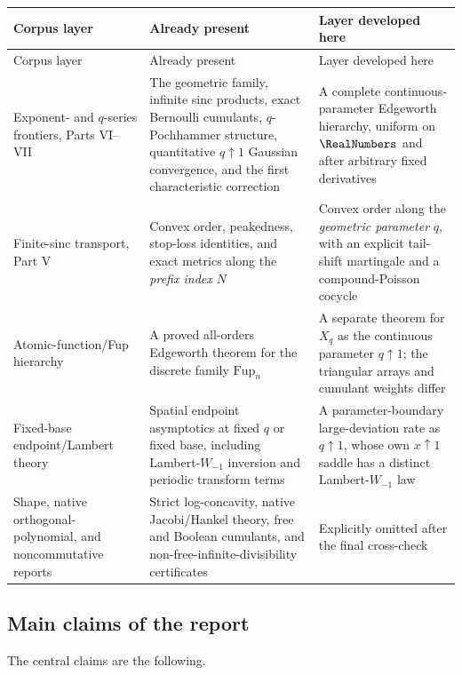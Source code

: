 \documentclass[11pt,a4paper]{article}
\theoremstyle{definition}
\begin{document}
\begin{longtable}{p{}p{}p{}}
\toprule
Corpus layer & Already present & Layer developed here \\
\midrule
\endfirsthead
\toprule
Corpus layer & Already present & Layer developed here \\
\midrule
\endhead
Exponent- and $q$-series frontiers, Parts VI--VII
& The geometric family, infinite sinc products, exact Bernoulli cumulants,
$q$-Pochhammer structure, quantitative $q\uparrow1$ Gaussian convergence, and
the first characteristic correction
& A complete continuous-parameter Edgeworth hierarchy, uniform on $\RealNumbers$ and
after arbitrary fixed derivatives \\
\addlinespace
Finite-sinc transport, Part V
& Convex order, peakedness, stop-loss identities, and exact metrics along the
\emph{prefix index} $N$
& Convex order along the \emph{geometric parameter} $q$, with an explicit
tail-shift martingale and a compound-Poisson cocycle \\
\addlinespace
Atomic-function/Fup hierarchy
& A proved all-orders Edgeworth theorem for the discrete family
$\mathrm{Fup}_n$
& A separate theorem for $X_q$ as the continuous parameter $q\uparrow1$;
the triangular arrays and cumulant weights differ \\
\addlinespace
Fixed-base endpoint/Lambert theory
& Spatial endpoint asymptotics at fixed $q$ or fixed base, including
Lambert-$W_{-1}$ inversion and periodic transform terms
& A parameter-boundary large-deviation rate as $q\uparrow1$, whose own
$x\uparrow1$ saddle has a distinct Lambert-$W_{-1}$ law \\
\addlinespace
Shape, native orthogonal-polynomial, and noncommutative reports
& Strict log-concavity, native Jacobi/Hankel theory, free and Boolean
cumulants, and non-free-infinite-divisibility certificates
& Explicitly omitted after the final cross-check \\
\bottomrule
\end{longtable}

\subsection{Main claims of the report}

The central claims are the following.
\end{document}
